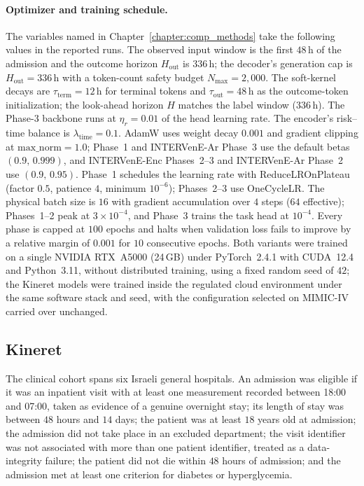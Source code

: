 \paragraph{Optimizer and training schedule.}
The variables named in Chapter~\ref{chapter:comp_methods} take the following values in the reported runs. The observed input window is the first $48$\,h of the admission and the outcome horizon $H_{\mathrm{out}}$ is $336$\,h; the decoder's generation cap is $H_{\mathrm{out}} = 336$\,h with a token-count safety budget $N_{\max} = 2{,}000$. The soft-kernel decays are $\tau_{\mathrm{term}} = 12$\,h for terminal tokens and $\tau_{\mathrm{out}} = 48$\,h as the outcome-token initialization; the look-ahead horizon $H$ matches the label window ($336$\,h). The Phase-3 backbone runs at $\eta_r = 0.01$ of the head learning rate. The encoder's risk--time balance is $\lambda_{\text{time}} = 0.1$. AdamW uses weight decay $0.001$ and gradient clipping at $\mathrm{max\_norm} = 1.0$; Phase~1 and INTERVenE-Ar Phase~3 use the default betas $(0.9,\,0.999)$, and INTERVenE-Enc Phases~2--3 and INTERVenE-Ar Phase~2 use $(0.9,\,0.95)$. Phase~1 schedules the learning rate with ReduceLROnPlateau (factor $0.5$, patience $4$, minimum $10^{-6}$); Phases~2--3 use OneCycleLR. The physical batch size is $16$ with gradient accumulation over $4$ steps ($64$ effective); Phases~1--2 peak at $3\times10^{-4}$, and Phase~3 trains the task head at $10^{-4}$. Every phase is capped at $100$ epochs and halts when validation loss fails to improve by a relative margin of $0.001$ for $10$ consecutive epochs. Both variants were trained on a single NVIDIA RTX~A5000 (24\,GB) under PyTorch~2.4.1 with CUDA~12.4 and Python~3.11, without distributed training, using a fixed random seed of $42$; the Kineret models were trained inside the regulated cloud environment under the same software stack and seed, with the configuration selected on MIMIC-IV carried over unchanged.

\subsection{Kineret}
\label{sec:evalm-kineret-cohort}

The clinical cohort spans six Israeli general hospitals. An admission was eligible if it was an inpatient visit with at least one measurement recorded between 18:00 and 07:00, taken as evidence of a genuine overnight stay; its length of stay was between $48$ hours and $14$ days; the patient was at least $18$ years old at admission; the admission did not take place in an excluded department; the visit identifier was not associated with more than one patient identifier, treated as a data-integrity failure; the patient did not die within $48$ hours of admission; and the admission met at least one criterion for diabetes or hyperglycemia.

